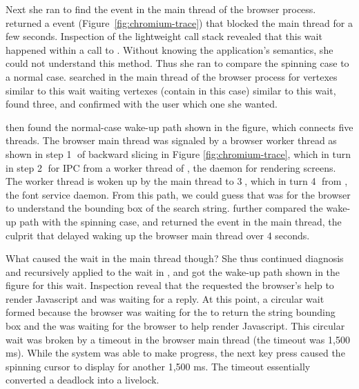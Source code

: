 \begin{figure*}[p]
    \centering
	 
    \caption{Chromium case study.}
    \label{fig:chromium-trace}
\end{figure*}

Next she ran \xxx to find the event in the main thread of the browser process.
\xxx returned a  event (Figure~\ref{fig:chromium-trace})
that blocked the main thread for a few seconds.  Inspection of the lightweight
call stack revealed that this wait happened within a call to
.  Without knowing the
application's semantics, she could not understand this method.  Thus she ran
\xxx to compare the spinning case to a normal case.  \xxx searched in the main
thread of the browser process for vertexes similar to this wait waiting
vertexes (contain  in this case) similar to
this wait, found three, and confirmed with the user which one she wanted.

\xxx then found the normal-case wake-up path shown in the figure, which
connects five threads.  The browser main thread was signaled by a browser
worker thread as shown in step \textcircled{1} of backward slicing in Figure
\ref{fig:chromium-trace}, which in turn  in step \textcircled{2}
for IPC from a worker thread of , the daemon for rendering screens.
The  worker thread is woken up by the  main thread to
 \textcircled{3}, which in turn  \textcircled{4}
from , the font service daemon.  From this path, we could guess that
 was for the browser to understand the bounding box of
the search string.  \xxx further compared the wake-up path with the spinning
case, and returned the  event in the  main
thread, the culprit that delayed waking up the browser main thread over 4
seconds.

What caused the wait in the  main thread though?  She thus
continued diagnosis and recursively applied \xxx to the wait in ,
and got the wake-up path shown in the figure for this wait.  Inspection reveal
that the  requested the browser's help to render Javascript and was
waiting for a reply.  At this point, a circular wait formed because the browser
was waiting for the  to return the string bounding box and the
 was waiting for the browser to help render Javascript.  This
circular wait was broken by a timeout in the browser main thread (the
 timeout was 1,500 ms).  While the system was able to make
progress, the next key press caused the spinning cursor to display for another
1,500 ms.  The timeout essentially converted a deadlock into a livelock.

